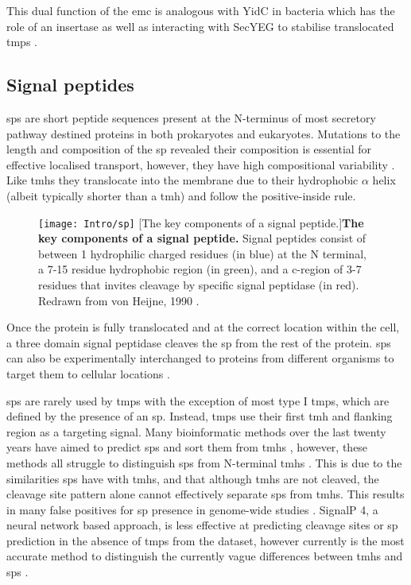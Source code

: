 This dual function of the \gls{emc} is analogous with YidC \cite{Shurtleff2018} in bacteria which has the role of an insertase \cite{Samuelson2000, Drew2003, Dalbey2014} as well as interacting with SecYEG to stabilise translocated \gls{tmp}s \cite{Nagamori2004}.

\subsection{Signal peptides}
\gls{sp}s are short peptide sequences present at the N-terminus of most secretory pathway destined proteins in both prokaryotes and eukaryotes.
Mutations to the length and composition of the \gls{sp} revealed their composition is essential for effective localised transport, however, they have high compositional variability \cite{VonHeijne1985}.
Like \gls{tmh}s they translocate into the membrane due to their hydrophobic $\alpha$ helix (albeit typically shorter than a \gls{tmh}) and follow the positive\--inside rule.

\begin{figure}[ht]
\centering
\texttt{[image: Intro/sp]}
		[The key components of a signal peptide.]{\textbf{The key components of a signal peptide.}
		Signal peptides consist of between 1 hydrophilic charged residues (in blue) at the N terminal, a 7-15 residue hydrophobic region (in green), and a c-region of 3-7 residues that invites cleavage by specific signal peptidase (in red).
	Redrawn from von Heijne, 1990 \cite{VonHeijne1990}.
		}
\label{fig:sp}
\end{figure}


Once the protein is fully translocated and at the correct location within the cell, a three domain signal peptidase cleaves the \gls{sp} from the rest of the protein.
\gls{sp}s can also be experimentally interchanged to proteins from different organisms to target them to cellular locations \cite{Izard1994, Gierasch1989}.

\gls{sp}s are rarely used by \gls{tmp}s with the exception of most type I \gls{tmp}s, which are defined by the presence of an \gls{sp}.
Instead, \gls{tmp}s use their first \gls{tmh} and flanking region as a targeting signal.
Many bioinformatic methods over the last twenty years have aimed to predict \gls{sp}s and sort them from \gls{tmh}s \cite{Choo2009}, however, these methods all struggle to distinguish \gls{sp}s from N-terminal \gls{tmh}s \cite{Petersen2011}.
This is due to the similarities \gls{sp}s have with \gls{tmh}s, and that although \gls{tmh}s are not cleaved, the cleavage site pattern alone cannot effectively separate \gls{sp}s from \gls{tmh}s.
This results in many false positives for \gls{sp} presence in genome\--wide studies \cite{Petersen2011}.
SignalP 4, a neural network based approach, is less effective at predicting cleavage sites or \gls{sp} prediction in the absence of \gls{tmp}s from the dataset, however currently is the most accurate method to distinguish the currently vague differences between \gls{tmh}s and \gls{sp}s \cite{Petersen2011}.

